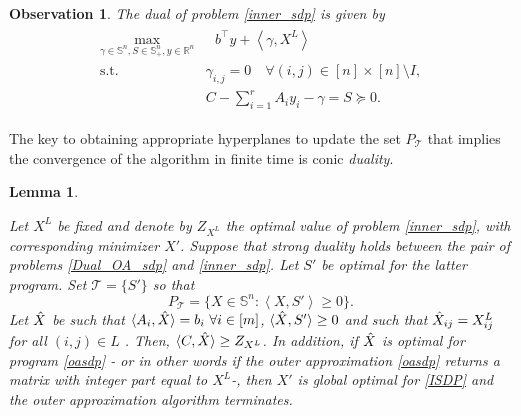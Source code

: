 \documentclass{article}
\newtheorem{observation}{Observation}
\newtheorem{lemma}{Lemma}
\begin{document}
\begin{observation}
The dual of problem \eqref{inner_sdp} is given by    
\begin{gather}\label{Dual_OA_sdp}\tag{DSDP($X^L$)}
    \begin{aligned}
\max_{\gamma \in \mathbb{S}^n, S \in \mathbb{S}^n_+ , y\in \mathbb{R}^n} & \ \  \  b^\top y  + \left \langle \gamma, X^L \right \rangle \\
\text{s.t.} \quad & \gamma_{i,j} = 0 \quad  \forall (i,j)\in  [n]\times [n] \setminus I , \\ 
& C - \sum_{i=1}^r  A_iy_i - \gamma = S  \succeq 0.
\end{aligned}
\end{gather}

\end{observation}


The key to obtaining appropriate hyperplanes to update the set $P_\mathcal{T}$ that implies the convergence of the algorithm in finite time is conic \textit{duality}.

\begin{lemma}\label{lem:finiteSDP}

Let $X^L$ be fixed and denote by $Z_{X^L}$ the optimal value of problem \eqref{inner_sdp}, with corresponding minimizer $X'$. Suppose that strong duality holds between the pair of problems 
\eqref{Dual_OA_sdp} and \eqref{inner_sdp}. 
Let $S'$ be optimal for the latter program. Set $\mathcal{T} = \{S'\}$ so that
\[
P_{\mathcal{T}} = \{X \in \mathbb{S}^n:\left \langle X,S'\right \rangle \geq 0\}. 
\]
Let $\Hat{X}$ be such that
$\langle A_i,\Hat{X}  \rangle = b_i \ \forall i \in [m]$, 
$\langle \Hat{X}, S' \rangle \geq 0$ and such that $\Hat{X}_{ij} = X^L_{ij}$ for all $(i,j) \in L$ . Then,
$\langle  C,\Hat{X} \rangle \geq Z_{X^L}$.
In addition, if $\Hat{X}$ is optimal for program \eqref{oasdp} - or in other words if the outer approximation \eqref{oasdp} returns a matrix with integer part equal to $X^L$-, then $X'$ is global optimal for \eqref{ISDP} and the outer approximation algorithm terminates.
\end{lemma}
\end{document}
